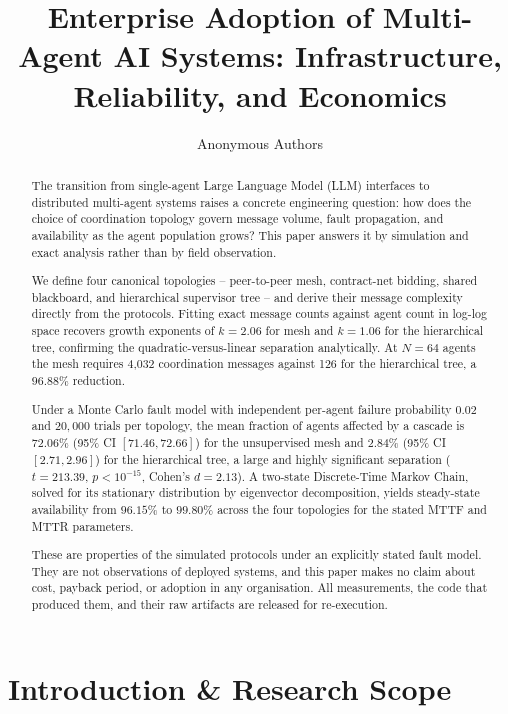 \documentclass{article}
\title{Enterprise Adoption of Multi-Agent AI Systems: Infrastructure, Reliability, and Economics}
\author{
  Anonymous Authors
}
\begin{document}
\maketitle

\begin{abstract}
The transition from single-agent Large Language Model (LLM) interfaces to distributed multi-agent systems raises a concrete engineering question: how does the choice of coordination topology govern message volume, fault propagation, and availability as the agent population grows? This paper answers it by simulation and exact analysis rather than by field observation.

We define four canonical topologies -- peer-to-peer mesh, contract-net bidding, shared blackboard, and hierarchical supervisor tree -- and derive their message complexity directly from the protocols. Fitting exact message counts against agent count in log-log space recovers growth exponents of $k = 2.06$ for mesh and $k = 1.06$ for the hierarchical tree, confirming the quadratic-versus-linear separation analytically. At $N = 64$ agents the mesh requires 4{,}032 coordination messages against 126 for the hierarchical tree, a $96.88\%$ reduction.

Under a Monte Carlo fault model with independent per-agent failure probability $0.02$ and $20{,}000$ trials per topology, the mean fraction of agents affected by a cascade is $72.06\%$ (95\% CI $[71.46, 72.66]$) for the unsupervised mesh and $2.84\%$ (95\% CI $[2.71, 2.96]$) for the hierarchical tree, a large and highly significant separation ($t = 213.39$, $p < 10^{-15}$, Cohen's $d = 2.13$). A two-state Discrete-Time Markov Chain, solved for its stationary distribution by eigenvector decomposition, yields steady-state availability from $96.15\%$ to $99.80\%$ across the four topologies for the stated MTTF and MTTR parameters.

These are properties of the simulated protocols under an explicitly stated fault model. They are not observations of deployed systems, and this paper makes no claim about cost, payback period, or adoption in any organisation. All measurements, the code that produced them, and their raw artifacts are released for re-execution.
\end{abstract}






\section{Introduction \& Research Scope}
\end{document}
